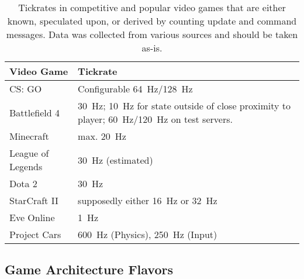 \begin{table}[!t]
\caption{Tickrates in competitive and popular video games that are either known, speculated upon, or derived by counting update and command messages. Data was collected from various sources and should be taken as-is.}
\label{tbl:tickrates}
	\centering
	\begin{tabu}{X[0.45]X}
		\toprule
		\textbf{Video Game} & \textbf{Tickrate} \\
		\midrule
		CS: GO & Configurable \SI{64}{\hertz}/\SI{128}{\hertz} \\
		Battlefield 4 & \SI{30}{\hertz}; \SI{10}{\hertz} for state outside of close proximity to player; \SI{60}{\hertz}/\SI{120}{\hertz} on test servers. \\
		Minecraft & max. \SI{20}{\hertz} \\
		League of Legends & \SI{30}{\hertz} (estimated) \\
		Dota 2 & \SI{30}{\hertz} \\
		StarCraft II & supposedly either \SI{16}{\hertz} or \SI{32}{\hertz} \\
		Eve Online & \SI{1}{\hertz} \\
		Project Cars & \SI{600}{\hertz} (Physics), \SI{250}{\hertz} (Input) \\ %
		\bottomrule
	\end{tabu}
\end{table}


\subsection{Game Architecture Flavors}

